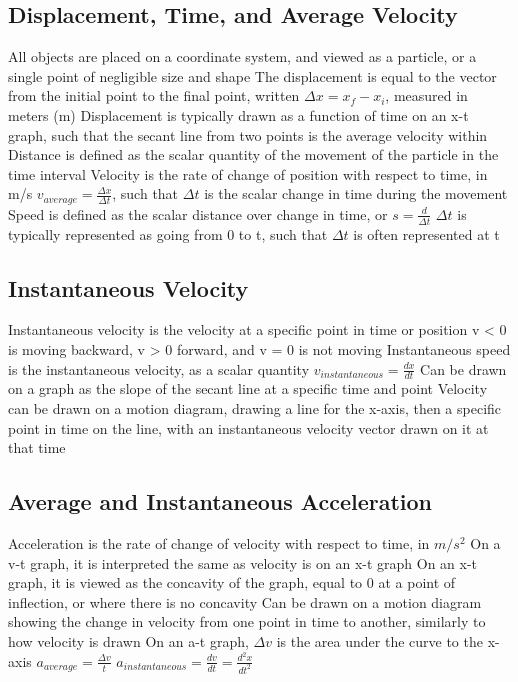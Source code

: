 \documentclass[11 pt, twoside]{article}
\newenvironment{outline*}
{
	\begin{outline}[enumerate]
	}
	{\end{outline}
}
\begin{document}
\subsection{Displacement, Time, and Average Velocity}
\begin{outline*}
\1 All objects are placed on a coordinate system, and viewed as a particle, or a single point of negligible size and shape
\1 The displacement is equal to the vector from the initial point to the final point, written $\Delta x = x_f - x_i$, measured in meters (m)
\2 Displacement is typically drawn as a function of time on an x-t graph, such that the secant line from two points is the average velocity within
\2 Distance is defined as the scalar quantity of the movement of the particle in the time interval
\1 Velocity is the rate of change of position with respect to time, in m/s
\1 $v_{average} = \frac{\Delta x}{\Delta t}$, such that $\Delta t$ is the scalar change in time during the movement
\2 Speed is defined as the scalar distance over change in time, or $s = \frac{d}{\Delta t}$
\2 $\Delta t$ is typically represented as going from 0 to t, such that $\Delta t$ is often represented at t
\end{outline*}
\subsection{Instantaneous Velocity}
\begin{outline*}
\1 Instantaneous velocity is the velocity at a specific point in time or position
\2 v < 0 is moving backward, v > 0 forward, and v = 0 is not moving
\2 Instantaneous speed is the instantaneous velocity, as a scalar quantity
\1 $v_{instantaneous} = \frac{dx}{dt}$
\2 Can be drawn on a graph as the slope of the secant line at a specific time and point
\1 Velocity can be drawn on a motion diagram, drawing a line for the x-axis, then a specific point in time on the line, with an instantaneous velocity vector drawn on it at that time
\end{outline*}
\subsection{Average and Instantaneous Acceleration}
\begin{outline*}
\1 Acceleration is the rate of change of velocity with respect to time, in $m/s^2$
\2 On a v-t graph, it is interpreted the same as velocity is on an x-t graph
\2 On an x-t graph, it is viewed as the concavity of the graph, equal to 0 at a point of inflection, or where there is no concavity
\2 Can be drawn on a motion diagram showing the change in velocity from one point in time to another, similarly to how velocity is drawn
\2 On an a-t graph, $\Delta v$ is the area under the curve to the x-axis
\1 $a_{average} = \frac{\Delta v}{t}$
\1 $a_{instantaneous} = \frac{dv}{dt} = \frac{d^2x}{dt^2}$
\end{outline*}
\end{document}
